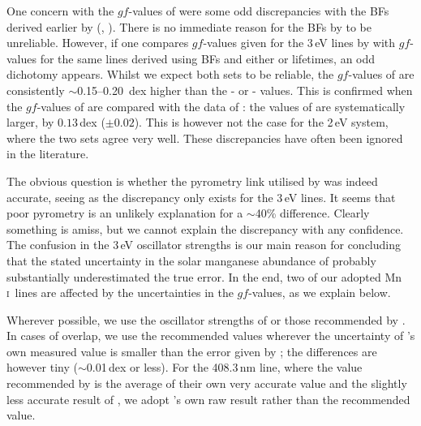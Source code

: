 \documentclass[traditabstract]{aa}
\newcommand{\altmni}{Mn\,\textsc{i}}
\begin{document}
One concern with the $gf$-values of \citet{Booth84c} were some odd
discrepancies with the BFs derived earlier by
\citeauthor{Greenlee79} (\citeyear{Greenlee79}, ).  
There is no immediate
reason for the BFs by  to be unreliable. However, if one
compares $gf$-values given for the \mbox{3\,eV} lines by
\citeauthor{Booth84c} with $gf$-values for the same lines derived using
 BFs and either \citet{Becker80} or
\citet{Schnabel95} lifetimes, 
an odd dichotomy appears. Whilst we expect both sets to be reliable,
the $gf$-values of \citet{Booth84c} are consistently
\mbox{$\sim$0.15--0.20 dex} higher than the
-\citeauthor{Becker80} or
-\citeauthor{Schnabel95} values. This is
confirmed when the $gf$-values of \citet{BW07} are compared with the
data of \citet{Booth84c}: the values of \citeauthor{Booth84c} are
systematically larger, by $0.13$\,dex ($\pm0.02$). This is however
not the case for the \mbox{2\,eV} system, where the two sets agree
very well. These discrepancies have often been ignored in
the literature.

The obvious question is whether the pyrometry link utilised by \citeauthor{Booth84c} was indeed accurate, seeing as the discrepancy only exists for the \mbox{3\,eV} lines.  It seems that poor pyrometry is an unlikely explanation for a $\sim$40\% difference.  Clearly something is amiss, but we cannot explain the discrepancy with any confidence. The confusion in the \mbox{3\,eV}
oscillator strengths is our main reason for concluding that the stated uncertainty in the
solar manganese abundance of \citet[][$\log \epsilon_\mathrm{Mn}=5.39\pm0.03$]{Booth84b} probably substantially underestimated the
true error. In the end, two of our adopted \altmni\ lines are affected by the uncertainties in the \citeauthor{Booth84c} $gf$-values, as we explain below.

Wherever possible, we use the oscillator strengths of \citet{BW07} or those recommended by \citet{DenHartog11}.  
In cases of overlap, we use the recommended \citet{DenHartog11} values wherever the uncertainty of \citeauthor{DenHartog11}'s own measured value is smaller than the error given by \cite{BW07}; the differences are however tiny ($\sim$0.01\,dex or less).  For the 408.3\,nm line, where the value recommended by \citeauthor{DenHartog11} is the average of their own very accurate value and the slightly less accurate result of \citet{BW05b}, we adopt \citeauthor{DenHartog11}'s own raw result rather than the recommended value.
\end{document}
